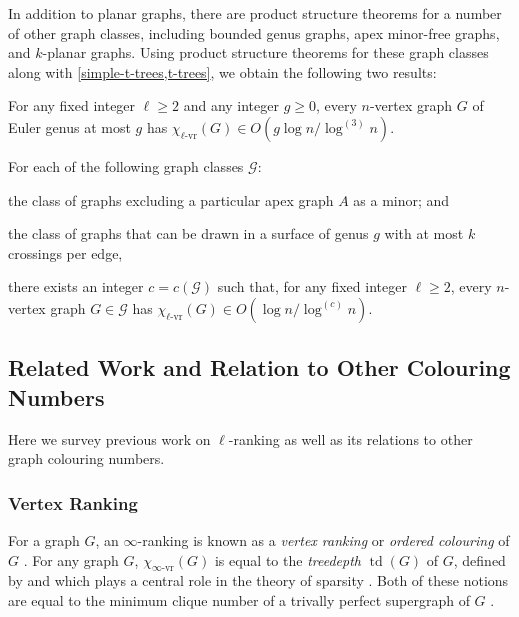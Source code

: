 \documentclass[kpfonts]{patmorin}
\newcommand{\defin}[1]{\emph{\color{brightmaroon}#1}}
\DeclareMathOperator{\td}{td}
\newcommand{\rn}[1]{\chi_{\operatorname{#1-vr}}}
\newcommand{\irn}{\rn{\infty}}
\newcommand{\lrn}{\rn{\ell}}
\theoremstyle{named}
\begin{document}
In addition to planar graphs, there are product structure theorems for a number of other graph classes, including bounded genus graphs, apex minor-free graphs, and $k$-planar graphs.  Using product structure theorems for these graph classes along with \cref{simple-t-trees,t-trees}, we obtain the following two results:

\begin{thm}\label{bounded-genus}
    For any fixed integer $\ell\ge 2$ and any integer $g\ge 0$, every $n$-vertex graph $G$ of Euler genus at most $g$ has $\lrn(G)\in O(g\log n/\log^{(3)} n)$.
\end{thm}

\begin{thm}\label{meta-theorem}\label{meta}
    For each of the following graph classes $\mathcal{G}$:
    \begin{compactenum}
        \item the class of graphs excluding a particular apex graph $A$ as a minor; and
        \item the class of graphs that can be drawn in a surface of genus $g$ with at most $k$ crossings per edge,
    \end{compactenum}
    there exists an integer $c=c(\mathcal{G})$ such that, for any fixed integer $\ell\ge 2$, every $n$-vertex graph $G\in\mathcal{G}$ has $\lrn(G)\in O(\log n/\log^{(c)} n)$.
\end{thm}



\subsection{Related Work and Relation to Other Colouring Numbers}

Here we survey previous work on $\ell$-ranking as well as its relations to other graph colouring numbers.

\subsubsection{Vertex Ranking}

For a graph $G$, an $\infty$-ranking is known as a \defin{vertex ranking} \cite{bodlaender.deogun.ea:rankings} or \defin{ordered colouring} of $G$ \cite{katchalski.mccuaig.ea:ordered}.  For any graph $G$, $\irn(G)$ is equal to the \defin{treedepth} $\td(G)$ of $G$, defined by \citet{nesetril.ossona:tree-depth} and which plays a central role in the theory of sparsity \cite{nesetril.ossona:on,nesetril.ossona:sparsity}.  Both of these notions are equal to the minimum clique number of a trivally perfect supergraph of $G$ \cite{nesetril.ossona:tree-depth}.
\end{document}

